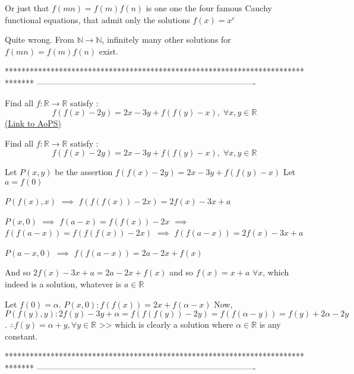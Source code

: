 \begin{solution}
	\begin{tcolorbox}Or just that $ f(mn)=f(m)f(n) $ is one one the four famous Cauchy functional equations, that admit only the solutions $ f(x)=x^c $ \end{tcolorbox}
Quite wrong.
From $\mathbb N\to\mathbb N$, infinitely many other solutions for  $ f(mn)=f(m)f(n) $ exist.
\end{solution}
*******************************************************************************
-------------------------------------------------------------------------------

\begin{problem}
	Find all $f:\mathbb{R}\rightarrow \mathbb{R}$ satisfy :
\[f(f(x)-2y)=2x-3y+f(f(y)-x),\;\forall x,y\in \mathbb{R}\]
	\flushright \href{https://artofproblemsolving.com/community/c6h593333}{(Link to AoPS)}
\end{problem}



\begin{solution}
	\begin{tcolorbox}Find all $f:\mathbb{R}\rightarrow \mathbb{R}$ satisfy :
\[f(f(x)-2y)=2x-3y+f(f(y)-x),\;\forall x,y\in \mathbb{R}\]\end{tcolorbox}
Let $P(x,y)$ be the assertion $f(f(x)-2y)=2x-3y+f(f(y)-x)$
Let $a=f(0)$

$P(f(x),x)$ $\implies$  $f(f(f(x))-2x)=2f(x)-3x+a$

$P(x,0)$ $\implies$ $f(a-x)=f(f(x))-2x$ $\implies$ $f(f(a-x))=f(f(f(x))-2x)$ $\implies$ $f(f(a-x))=2f(x)-3x+a$

$P(a-x,0)$ $\implies$ $f(f(a-x))=2a-2x+f(x)$

And so $2f(x)-3x+a=2a-2x+f(x)$ and so $\boxed{f(x)=x+a}$ $\forall x$, which indeed is a solution, whatever is $a\in\mathbb R$
\end{solution}



\begin{solution}
	Let $f(0)=\alpha$.
$P(x,0): f(f(x)) = 2x + f(\alpha -x)$
Now, $P(f(y), y): 2f(y)-3y+\alpha = f(f(f(y))-2y) = f(f(\alpha-y))=f(y) + 2\alpha - 2y$.
$\therefore f(y) = \alpha +y, \forall y \in \mathbb{R}$ >> which is clearly a solution where $\alpha \in \mathbb{R}$ is any constant.
\end{solution}
*******************************************************************************
-------------------------------------------------------------------------------

